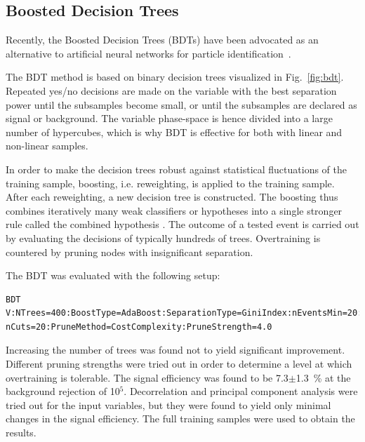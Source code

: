 \documentclass[a4paper]{jpconf}
\begin{document}




\subsection{Boosted Decision Trees}

Recently, the Boosted Decision Trees (BDTs) have been advocated as an alternative to
artificial neural networks for particle identification~\cite{bdt}.

The BDT method is based on binary decision trees visualized in Fig.~\ref{fig:bdt}.
Repeated yes/no decisions are made on the variable with the
best separation power until the subsamples become small, 
or until the subsamples are declared as signal or background. 
The variable phase-space is hence divided into a large number of hypercubes, 
which is why BDT is effective for both with linear and non-linear samples.

In order to make the decision trees robust against statistical
fluctuations of the training sample, boosting, i.e. reweighting, is
applied to the training sample. After each reweighting, a new decision
tree is constructed.
The boosting thus combines iteratively many weak classifiers or hypotheses
into a single stronger rule called the combined hypothesis \cite{bdt}.
The outcome of a tested event is carried out
by evaluating the decisions of typically hundreds of
trees. Overtraining is countered by pruning nodes with insignificant
separation.

The BDT was evaluated with the following setup:
\begin{verbatim}
BDT V:NTrees=400:BoostType=AdaBoost:SeparationType=GiniIndex:nEventsMin=20:
nCuts=20:PruneMethod=CostComplexity:PruneStrength=4.0
\end{verbatim}
Increasing the number of trees was found not to yield significant
improvement. Different pruning strengths were tried out in order to
determine a level at which overtraining is tolerable.
The signal efficiency was found to be 7.3$\pm$1.3~\% at the background rejection of 10$^5$.
Decorrelation and principal component analysis were tried out for the input variables, 
but they were found to yield only minimal changes in the signal efficiency.
The full training samples were used to obtain the results.
\end{document}
